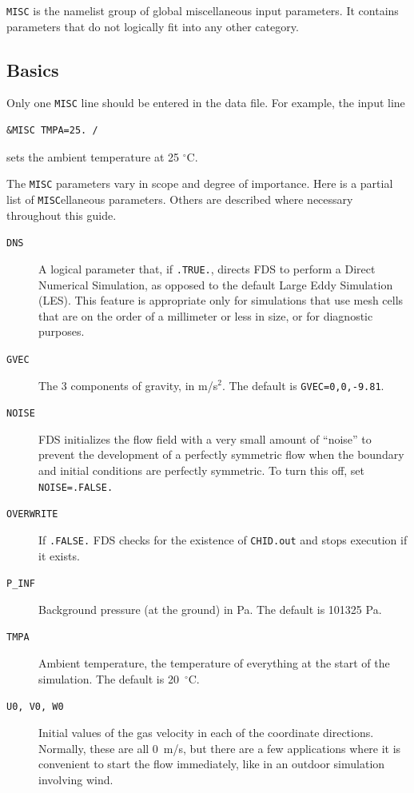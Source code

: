 \documentclass[11pt]{book}
\newcommand{\ct}{\tt\small}
\begin{document}
{\ct MISC} is the namelist group of global miscellaneous input parameters. It contains parameters that do not logically fit into any other category.

\subsection{Basics}

\label{info:MISC_Basics}

Only one {\ct MISC} line should be entered in the data file. For example, the input line

\footnotesize
\begin{verbatim}
&MISC TMPA=25. /
\end{verbatim}
\normalsize

\noindent
sets the ambient temperature at 25 $^\circ$C.

The {\ct MISC} parameters vary in scope and degree of importance. Here is a partial list of {\ct MISC}ellaneous parameters. Others are described where necessary throughout this
guide.

\begin{description}
\item[{\ct DNS}] A logical parameter that, if {\ct .TRUE.}, directs FDS to perform a Direct Numerical Simulation,
as opposed to the default Large Eddy Simulation (LES). This feature is appropriate only for simulations that use mesh cells that are
on the order of a millimeter or less in size, or for diagnostic purposes.
\item[{\ct GVEC}] The 3 components of gravity, in m/s$^2$. The default is {\ct GVEC=0,0,-9.81}.
\item[{\ct NOISE}] FDS initializes the flow field with a very small amount of ``noise'' to prevent the
development of a perfectly symmetric flow when the boundary
and initial conditions are perfectly symmetric. To turn this off, set {\ct NOISE=.FALSE.}
\item[{\ct OVERWRITE}] If {\ct .FALSE.} FDS checks for the existence of  {\ct CHID.out} and stops execution if it exists.
\item[{\ct P\_INF}] Background pressure (at the ground) in Pa. The default is 101325 Pa.
\item[{\ct TMPA}] Ambient temperature, the temperature of everything at the start of the simulation. The default is 20~$^\circ$C.
\item[{\ct U0, V0, W0}] Initial values of the gas velocity in each of the coordinate directions. Normally, these are all 0~m/s, but there are a few applications where it is
convenient to start the flow immediately, like in an outdoor simulation involving wind.
\end{description}
\end{document}
